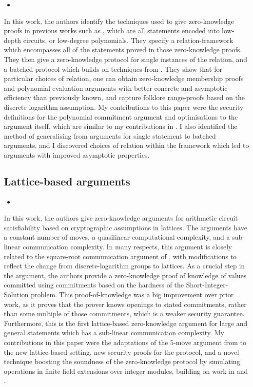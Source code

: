 \begin{itemize}
\item {}
\end{itemize}

In this work, the authors identify the techniques used to give zero-knowledge proofs in previous works such as \cite{BayerG13, GrothK15, BootleCCGGP15}, which are all statements encoded into low-depth circuits, or low-degree polynomials. They specify a relation-framework which encompasses all of the statements proved in those zero-knowledge proofs. They then give a zero-knowledge protocol for single instances of the relation, and a batched protocol which builds on techniques from \cite{Bayer2014}. They show that for particular choices of relation, one can obtain zero-knowledge membership proofs and polynomial evaluation arguments with better concrete and asymptotic efficiency than previously known, and capture folklore range-proofs based on the discrete logarithm assumption. My contributions to this paper were the security definitions for the polynomial commitment argument and optimisations to the argument itself, which are similar to my contributions in \cite{BootleCCGP16}. I also identified the method of generalising from arguments for single statement to batched arguments, and I discovered choices of relation within the framework which led to arguments with improved asymptotic properties.

\subsection*{Lattice-based arguments}

\begin{itemize}
\item {}
\end{itemize}

In this work, the authors give zero-knowledge arguments for arithmetic circuit satisfiability based on cryptographic assumptions in lattices. The arguments have a constant number of moves, a quasilinear computational complexity, and a sub-linear communication complexity. In many respects, this argument is closely related to the square-root communication argument of \cite{BootleCCGP16}, with modifications to reflect the change from discrete-logarithm groups to lattices. As a crucial step in the argument, the authors provide a zero-knowledge proof of knowledge of values committed using commitments based on the hardness of the Short-Integer-Solution problem. This proof-of-knowledge was a big improvement over prior work, as it proves that the prover knows openings to stated commitments, rather than some multiple of those commitments, which is a weaker security guarantee. Furthermore, this is the first lattice-based zero-knowledge argument for large and general statements which has a sub-linear communication complexity. My contributions in this paper were the adaptations of the 5-move argument from \cite{BootleCCGP16} to the new lattice-based setting, new security proofs for the protocol, and a novel technique boosting the soundness of the zero-knowledge protocol by simulating operations in finite field extensions over integer modules, building on work in \cite{CramerDP12} and \cite{CramerDK14}.

